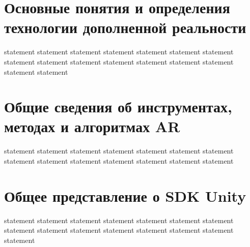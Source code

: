 \section{Основные понятия и определения технологии дополненной реальности}

{statement}
{statement}
{statement}
{statement}
{statement}
{statement}
{statement}
{statement}
{statement}
{statement}
{statement}
{statement}
{statement}
{statement}
{statement}
{statement}

\section{Общие сведения об инструментах, методах и алгоритмах AR}

{statement}
{statement}
{statement}
{statement}
{statement}
{statement}
{statement}
{statement}
{statement}
{statement}
{statement}
{statement}
{statement}
{statement}

\section{Общее представление о SDK Unity}

{statement}
{statement}
{statement}
{statement}
{statement}
{statement}
{statement}
{statement}
{statement}
{statement}
{statement}
{statement}
{statement}
{statement}
{statement}

